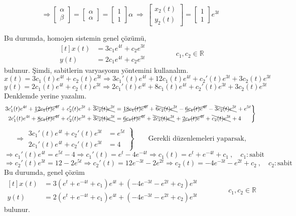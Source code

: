 \documentclass[11pt,a4paper]{article}
\begin{document}
\begin{cozum}
\[\]
\[
\Rightarrow \begin{bmatrix} \alpha \\ \beta \end{bmatrix} = \begin{bmatrix} \alpha \\ \alpha \end{bmatrix} = \begin{bmatrix} 1 \\ 1 \end{bmatrix}\alpha \ \Rightarrow \ \begin{bmatrix} x_2(t) \\ y_2(t) \end{bmatrix} = \begin{bmatrix} 1 \\ 1 \end{bmatrix}e^{3t}
\]

Bu durumda, homojen sistemin genel çözümü,
\[
\begin{aligned}[t] x(t) &= 3c_1e^{4t} + c_2e^{3t} \\ y(t) &= 2c_1e^{4t} + c_2e^{3t} \end{aligned} \qquad\qquad c_1, c_2 \in \mathbb{R}
\]
bulunur. Şimdi, sabitlerin varyasyonu yöntemini kullanalım.
\[
x(t) = 3c_1(t)e^{4t} + c_2(t)e^{3t} \Rightarrow 3c_1'(t)e^{4t} + 12c_1(t)e^{4t} + c_2'(t)e^{3t} + 3c_2(t)e^{3t}
\]
\[
y(t) = 2c_1(t)e^{4t} + c_2(t)e^{3t} \Rightarrow 2c_1'(t)e^{4t} + 8c_1(t)e^{4t} + c_2'(t)e^{3t} + 3c_2(t)e^{3t}
\]
Denklemde yerine yazalım.
{\small
\[
\left.\begin{aligned}
3c_1'(t)e^{4t} + \carp{12c_1(t)e^{4t}} + c_2'(t)e^{3t} + \carpt{3c_2(t)e^{3t}} &= \carp{18c_1(t)e^{4t}} + \carpt{6c_2(t)e^{3t}} - \carp{6c_1(t)e^{4t}} - \carpt{3c_2(t)e^{3t}} + e^{5t} \\
2c_1'(t)e^{4t} + \carp{8c_1(t)e^{4t}} + c_2'(t)e^{3t} + \carpt{3c_2(t)e^{3t}} &= \carp{6c_1(t)e^{4t}} + \carpt{2c_2(t)e^{3t}} + \carp{2c_1(t)e^{4t}} + \carpt{c_2(t)e^{3t}} + 4
\end{aligned}\right\}
\]}
\[
\Rightarrow \left.\begin{aligned} 3c_1'(t)e^{4t} + c_2'(t)e^{3t} &= e^{5t} \\ 2c_1'(t)e^{4t} + c_2'(t)e^{3t} &= 4 \end{aligned}\right\} \qquad \text{Gerekli düzenlemeleri yaparsak,}
\]
\[
\Rightarrow c_1'(t)e^{4t} = e^{5t} - 4 \Rightarrow c_1'(t) = e^{t} - 4e^{-4t} \Rightarrow c_1(t) = e^{t} + e^{-4t} + c_1 \ , \quad c_1 : \text{sabit}
\]
\[
\Rightarrow c_2'(t)e^{3t} = 12 - 2e^{5t} \Rightarrow c_2'(t) = 12e^{-3t} - 2e^{2t} \Rightarrow c_2(t) = -4e^{-3t} - e^{2t} + c_2 \ , \quad c_2 : \text{sabit}
\]
Bu durumda, genel çözüm
\[
\begin{aligned}[t] x(t) &= 3\left(e^{t} + e^{-4t} + c_1\right)e^{4t} + \left(-4e^{-3t} - e^{2t} + c_2\right)e^{3t} \\ y(t) &= 2\left(e^{t} + e^{-4t} + c_1\right)e^{4t} + \left(-4e^{-3t} - e^{2t} + c_2\right)e^{3t} \end{aligned} \qquad\qquad c_1, c_2 \in \mathbb{R}
\]
bulunur.


\end{cozum}
\end{document}
